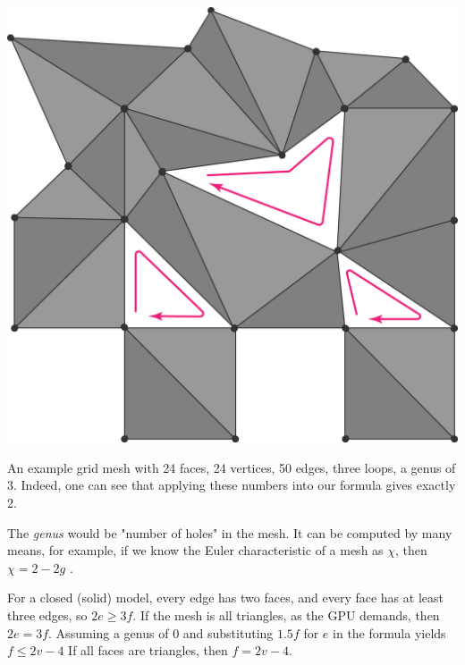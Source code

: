 \begin{marginfigure}
    \centering
    \includegraphics[width=0.9\linewidth]{images/meshloop1.png}
    \caption{An example grid mesh with 24 faces, 24 vertices,
    50 edges, three loops, a genus of 3. Indeed, one can see that
    applying these numbers into our formula gives exactly 2.}
\end{marginfigure}

The \textit{genus} would be "number of holes" in the mesh. It can be computed
by many means, for example, if we know the Euler characteristic of a mesh
as $\chi$, then $\chi = 2 - 2g$ \cite{weisstein_genus}.

For a closed (solid) model, every edge has two faces, and every face has at least
three edges, so $2e \ge 3f$. If the mesh is all triangles, as the GPU demands, then
$2e = 3f$. Assuming a genus of $0$ and substituting $1.5f$ for $e$ in the formula 
yields $f \le 2v-4$ If all faces are triangles, then $f = 2v-4$.

